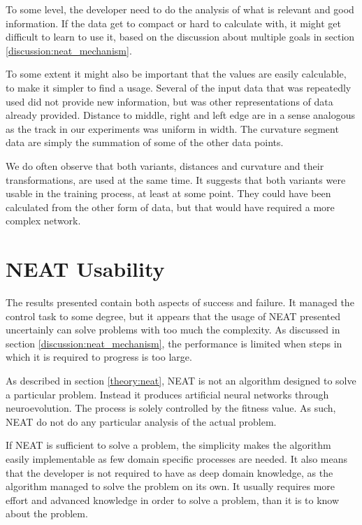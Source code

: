 To some level, the developer need to do the analysis of what is relevant and good information. If the data get to compact or hard to calculate with, it might get difficult to learn to use it, based on the discussion about multiple goals in section \ref{discussion:neat_mechanism}.

To some extent it might also be important that the values are easily calculable, to make it simpler to find a usage. Several of the input data that was repeatedly used did not provide new information, but was other representations of data already provided. Distance to middle, right and left edge are in a sense analogous as the track in our experiments was uniform in width. The curvature segment data are simply the summation of some of the other data points.

We do often observe that both variants, distances and curvature and their transformations, are used at the same time. It suggests that both variants were usable in the training process, at least at some point. They could have been calculated from the other form of data, but that would have required a more complex network.

\section{NEAT Usability}

The results presented contain both aspects of success and failure. It managed the control task to some degree, but it appears that the usage of NEAT presented uncertainly can solve problems with too much the complexity. As discussed in section \ref{discussion:neat_mechanism}, the performance is limited when steps in which it is required to progress is too large.

As described in section \ref{theory:neat}, NEAT is not an algorithm designed to solve a particular problem. Instead it produces artificial neural networks through neuroevolution. The process is solely controlled by the fitness value. As such, NEAT do not do any particular analysis of the actual problem. 

If NEAT is sufficient to solve a problem, the simplicity makes the algorithm easily implementable as few domain specific processes are needed. It also means that the developer is not required to have as deep domain knowledge, as the algorithm managed to solve the problem on its own. It usually requires more effort and advanced knowledge in order to solve a problem, than it is to know about the problem.



